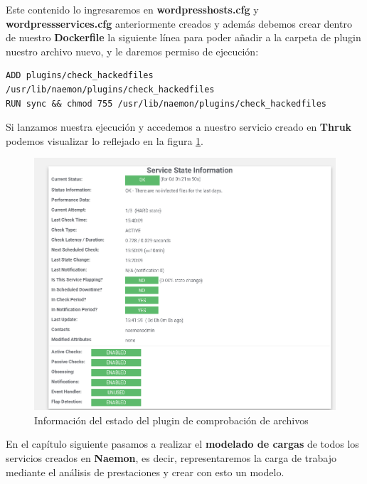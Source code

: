 Este contenido lo ingresaremos en \textbf{wordpresshosts.cfg} y \textbf{wordpressservices.cfg} anteriormente creados y además debemos crear dentro de nuestro \textbf{Dockerfile} la siguiente línea para poder añadir a la carpeta de plugin nuestro archivo nuevo, y le daremos permiso de ejecución:

\begin{lstlisting}
ADD plugins/check_hackedfiles /usr/lib/naemon/plugins/check_hackedfiles
RUN sync && chmod 755 /usr/lib/naemon/plugins/check_hackedfiles
\end{lstlisting}
\newpage
Si lanzamos nuestra ejecución y accedemos a nuestro servicio creado en \textbf{Thruk} podemos visualizar lo reflejado en la figura \ref{check_hackfiles}.

\begin{figure}[H]
	\centering
	\includegraphics[scale=0.3]{imagenes/wordpress/analisis_naemon/check_hackfiles.png}
	\caption{Información del estado del plugin de comprobación de archivos} \label{check_hackfiles}
\end{figure}

En el capítulo siguiente pasamos a realizar el \textbf{modelado de cargas} de todos los servicios creados en \textbf{Naemon}, es decir, representaremos la carga de trabajo mediante el análisis de prestaciones y crear con esto un modelo.
\newpage